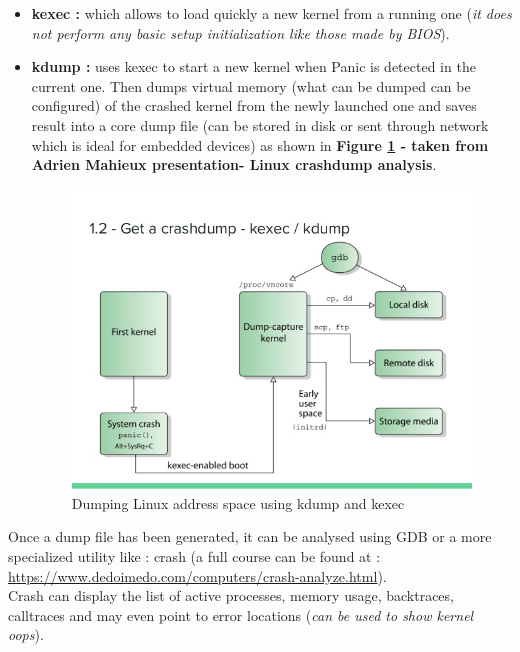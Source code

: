 \begin{itemize}
\begin{itemize}
	
	\item \textbf{kexec : } which allows to load quickly a new kernel from a running one (\textit{it does not perform any basic setup initialization like those made by BIOS}).
	\item \textbf{kdump : } uses kexec to start a new kernel when Panic is detected in the current one. Then dumps virtual memory (what can be dumped can be configured) of the crashed kernel from the newly launched one and saves result into a core dump file (can be stored in disk or sent through network which is ideal for embedded devices) as shown in \textbf{Figure \ref{Dumping Linux address space using kdump and kexec} - taken from Adrien Mahieux presentation- Linux crashdump analysis}. 
	\begin{figure}[H]
		\centering
        \includegraphics[scale=0.55]{img/solution/kdump-kexec.jpg}
        \caption{Dumping Linux address space using kdump and kexec}
        \label{Dumping Linux address space using kdump and kexec}
    \end{figure}

\end{itemize}




Once a dump file has been generated, it can be analysed using GDB or a more specialized utility like : crash (a full course can be found at : {\color{blue}\url{https://www.dedoimedo.com/computers/crash-analyze.html}}).\\
Crash can display the list of active processes, memory usage, backtraces, calltraces and may even point to error locations (\emph{can be used to show kernel oops}).
	
\end{itemize}



